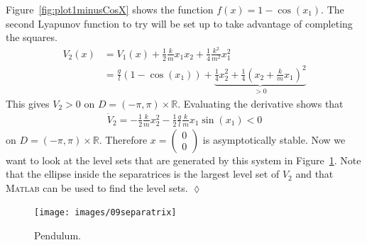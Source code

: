\begin{example}
Figure~\ref{fig:plot1minusCosX} shows the function $f(x) = 1-\cos(x_1)$.
The second Lyapunov function to try will be set up to take advantage of completing the squares.
\begin{align*}
V_2(x) &= V_1(x) + \tfrac{1}{2}\tfrac{k}{m}x_1x_2 + \tfrac{1}{4}\tfrac{k^2}{m^2}x_1^2 \\
       &= \tfrac{g}{l}(1-\cos(x_1)) + \underbrace{\tfrac{1}{4}x_2^2 + \tfrac{1}{4}{(x_2+\tfrac{k}{m}x_1)}^2}_{>0}
\end{align*}
This gives $V_2>0$ on $D=(-\pi,\pi)\times\mathbb{R}$.
Evaluating the derivative shows that
\begin{align*}
\dot{V}_2 = -\tfrac{1}{2}\tfrac{k}{m}x_2^2 - \tfrac{1}{2}\tfrac{g}{l}\tfrac{k}{m}x_1\sin(x_1) < 0
\end{align*}
on $D=(-\pi,\pi)\times\mathbb{R}$.
Therefore $x=\left(\begin{array}{c} 0 \\ 0 \end{array}\right)$ is asymptotically stable.
Now we want to look at the level sets that are generated by this system in Figure~\ref{fig:09separatrix}.
Note that the ellipse inside the separatrices is the largest level set of $V_2$ and that \textsc{Matlab} can be used to find the level sets.
$\lozenge$
\end{example}

\begin{figure}[ht!]
\centering
\texttt{[image: images/09separatrix]}
\caption{Pendulum.}
\label{fig:09separatrix}
\end{figure}%
